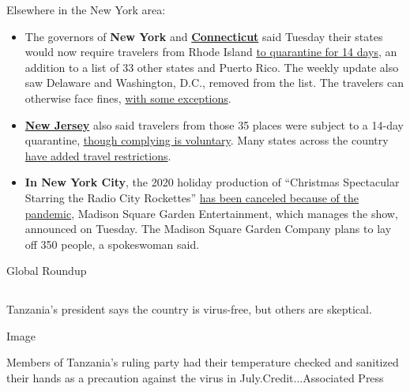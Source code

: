Elsewhere in the New York area:

\begin{itemize}
\item
  The governors of \textbf{New York} and
  \textbf{\href{https://twitter.com/GovNedLamont/status/1290658706003238913}{Connecticut}}
  said Tuesday their states would now require travelers from Rhode
  Island
  \href{https://coronavirus.health.ny.gov/covid-19-travel-advisory}{to
  quarantine for 14 days}, an addition to a list of 33 other states and
  Puerto Rico. The weekly update also saw Delaware and Washington, D.C.,
  removed from the list. The travelers can otherwise face fines,
  \href{https://portal.ct.gov/Coronavirus/Travel}{with some exceptions}.
\item
  \textbf{\href{https://twitter.com/GovMurphy/status/1290656319578484737}{New
  Jersey}} also said travelers from those 35 places were subject to a
  14-day quarantine,
  \href{https://covid19.nj.gov/faqs/nj-information/travel-information/which-states-are-on-the-travel-advisory-list-are-there-travel-restrictions-to-or-from-new-jersey}{though
  complying is voluntary}. Many states across the country
  \href{https://www.nytimes.com/2020/07/10/travel/state-travel-restrictions.html?referringSource=articleShare}{have
  added travel restrictions}.
\end{itemize}

\begin{itemize}
\tightlist
\item
  \textbf{In New York City}, the 2020 holiday production of ``Christmas
  Spectacular Starring the Radio City Rockettes''
  \href{https://www.nytimes.com/2020/08/04/theater/radio-city-rockettes-christmas-canceled.html}{has
  been canceled because of the pandemic}, Madison Square Garden
  Entertainment, which manages the show, announced on Tuesday. The
  Madison Square Garden Company plans to lay off 350 people, a
  spokeswoman said.
\end{itemize}

Global Roundup

\hypertarget{-7}{%
\subsection{}\label{-7}}

Tanzania's president says the country is virus-free, but others are
skeptical.

Image

Members of Tanzania's ruling party had their temperature checked and
sanitized their hands as a precaution against the virus in
July.Credit...Associated Press

